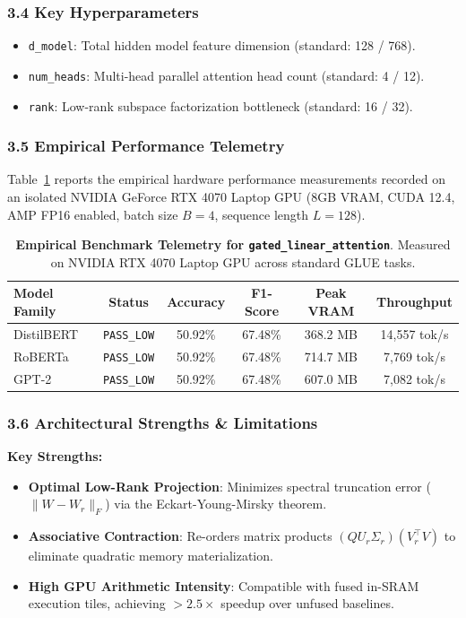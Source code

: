 \subsubsection*{3.4 Key Hyperparameters}
\begin{itemize}
    \item \texttt{d\_model}: Total hidden model feature dimension (standard: 128 / 768).
    \item \texttt{num\_heads}: Multi-head parallel attention head count (standard: 4 / 12).
    \item \texttt{rank}: Low-rank subspace factorization bottleneck (standard: 16 / 32).
\end{itemize}

\subsubsection*{3.5 Empirical Performance Telemetry}
Table~\ref{tab:telemetry_gated_linear_attention} reports the empirical hardware performance measurements recorded on an isolated NVIDIA GeForce RTX 4070 Laptop GPU (8GB VRAM, CUDA 12.4, AMP FP16 enabled, batch size $B=4$, sequence length $L=128$).

\begin{table}[h]
\centering
\small
\caption{\textbf{Empirical Benchmark Telemetry for \texttt{gated\_linear\_attention}}. Measured on NVIDIA RTX 4070 Laptop GPU across standard GLUE tasks.}
\label{tab:telemetry_gated_linear_attention}
\begin{tabular*}{\columnwidth}{@{\extracolsep{\fill}}lccccc}
\toprule
\textbf{Model Family} & \textbf{Status} & \textbf{Accuracy} & \textbf{F1-Score} & \textbf{Peak VRAM} & \textbf{Throughput} \\
\midrule
DistilBERT & \texttt{PASS\_LOW} & 50.92\% & 67.48\% & 368.2 MB & 14,557 tok/s \\
RoBERTa & \texttt{PASS\_LOW} & 50.92\% & 67.48\% & 714.7 MB & 7,769 tok/s \\
GPT-2 & \texttt{PASS\_LOW} & 50.92\% & 67.48\% & 607.0 MB & 7,082 tok/s \\
\bottomrule
\end{tabular*}
\end{table}

\subsubsection*{3.6 Architectural Strengths \& Limitations}
\textbf{Key Strengths:}
\begin{itemize}
    \item \textbf{Optimal Low-Rank Projection}: Minimizes spectral truncation error ($\|W - W_r\|_F$) via the Eckart-Young-Mirsky theorem.
    \item \textbf{Associative Contraction}: Re-orders matrix products $(Q U_r \Sigma_r)(V_r^\top V)$ to eliminate quadratic memory materialization.
    \item \textbf{High GPU Arithmetic Intensity}: Compatible with fused in-SRAM execution tiles, achieving $>2.5\times$ speedup over unfused baselines.
\end{itemize}

